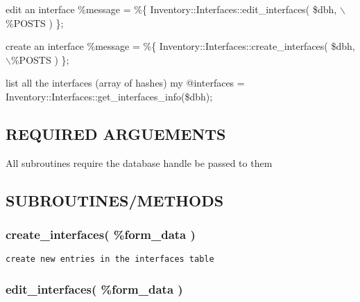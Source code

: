 \documentclass{book}
\begin{document}
edit an interface \%message = \%\{ Inventory::Interfaces::edit\_interfaces( \$dbh, $\backslash$\%POSTS ) \};



create an interface \%message = \%\{ Inventory::Interfaces::create\_interfaces( \$dbh, $\backslash$\%POSTS ) \};



list all the interfaces (array of hashes) my @interfaces = Inventory::Interfaces::get\_interfaces\_info(\$dbh);


\subsection{REQUIRED ARGUEMENTS}
\label{Inventory::Interfaces_REQUIRED_ARGUEMENTS}
\hypertarget{Inventory::Interfaces_REQUIRED_ARGUEMENTS}{}



All subroutines require the database handle be passed to them


\subsection{SUBROUTINES/METHODS}
\label{Inventory::Interfaces_SUBROUTINES_METHODS}
\hypertarget{Inventory::Interfaces_SUBROUTINES_METHODS}{}


\subsubsection{create\protect\_interfaces( \%form\protect\_data )}
\label{Inventory::Interfaces_create_interfaces_form_data_}
\hypertarget{Inventory::Interfaces_create_interfaces_form_data_}{}


\begin{Verbatim}[fontfamily=courier,gobble=1,frame=lines,fontsize=\small]
  create new entries in the interfaces table
\end{Verbatim}


\subsubsection{edit\protect\_interfaces( \%form\protect\_data )}
\label{Inventory::Interfaces_edit_interfaces_form_data_}
\hypertarget{Inventory::Interfaces_edit_interfaces_form_data_}{}
\end{document}
